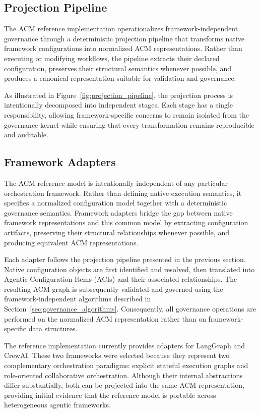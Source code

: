 \documentclass[10pt]{article}
\begin{document}
\subsection{Projection Pipeline}
\label{sec:projection_pipeline}

The ACM reference implementation operationalizes framework-independent governance through a deterministic projection pipeline that transforms native framework configurations into normalized ACM representations. Rather than executing or modifying workflows, the pipeline extracts their declared configuration, preserves their structural semantics whenever possible, and produces a canonical representation suitable for validation and governance.

As illustrated in Figure~\ref{fig:projection_pipeline}, the projection process is intentionally decomposed into independent stages. Each stage has a single responsibility, allowing framework-specific concerns to remain isolated from the governance kernel while ensuring that every transformation remains reproducible and auditable.

\subsection{Framework Adapters}
\label{sec:framework_adapters}

The ACM reference model is intentionally independent of any particular orchestration framework. Rather than defining native execution semantics, it specifies a normalized configuration model together with a deterministic governance semantics. Framework adapters bridge the gap between native framework representations and this common model by extracting configuration artifacts, preserving their structural relationships whenever possible, and producing equivalent ACM representations.

Each adapter follows the projection pipeline presented in the previous section. Native configuration objects are first identified and resolved, then translated into Agentic Configuration Items (ACIs) and their associated relationships. The resulting ACM graph is subsequently validated and governed using the framework-independent algorithms described in Section~\ref{sec:governance_algorithms}. Consequently, all governance operations are performed on the normalized ACM representation rather than on framework-specific data structures.

The reference implementation currently provides adapters for LangGraph and CrewAI. These two frameworks were selected because they represent two complementary orchestration paradigms: explicit stateful execution graphs and role-oriented collaborative orchestration. Although their internal abstractions differ substantially, both can be projected into the same ACM representation, providing initial evidence that the reference model is portable across heterogeneous agentic frameworks.
\end{document}
